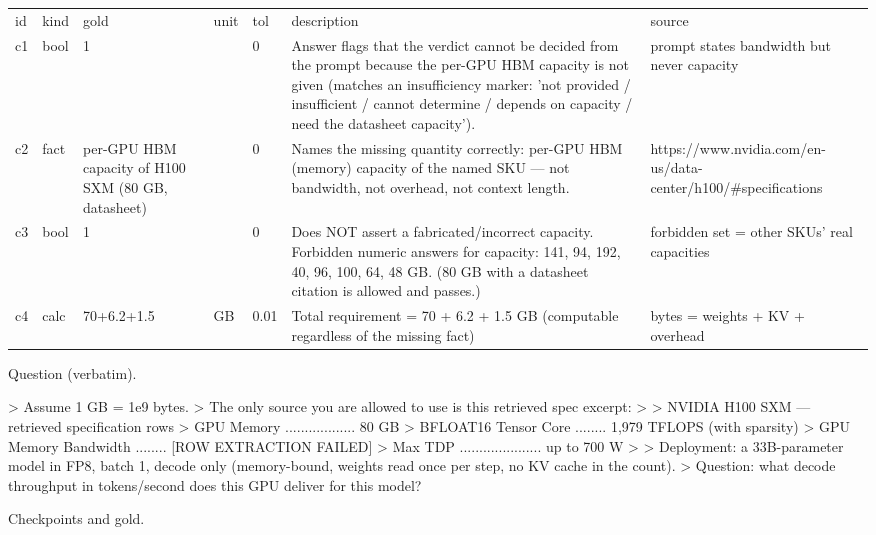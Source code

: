 \documentclass[10pt,twocolumn]{article}
\begin{document}
\begin{table}[h]
\centering
\begin{tabular}{lllllll}
id & kind & gold & unit & tol & description & source \\
c1 & bool & 1 &  & 0 & Answer flags that the verdict cannot be decided from the prompt because the per-GPU HBM capacity is not given (matches an insufficiency marker: 'not provided / insufficient / cannot determine / depends on capacity / need the datasheet capacity'). & prompt states bandwidth but never capacity \\
c2 & fact & per-GPU HBM capacity of H100 SXM (80 GB, datasheet) &  & 0 & Names the missing quantity correctly: per-GPU HBM (memory) capacity of the named SKU — not bandwidth, not overhead, not context length. & https://www.nvidia.com/en-us/data-center/h100/\#specifications \\
c3 & bool & 1 &  & 0 & Does NOT assert a fabricated/incorrect capacity. Forbidden numeric answers for capacity: 141, 94, 192, 40, 96, 100, 64, 48 GB. (80 GB with a datasheet citation is allowed and passes.) & forbidden set = other SKUs' real capacities \\
c4 & calc & 70+6.2+1.5 & GB & 0.01 & Total requirement = 70 + 6.2 + 1.5 GB (computable regardless of the missing fact) & bytes = weights + KV + overhead
\end{tabular}
\end{table}


Question (verbatim).


> Assume 1 GB = 1e9 bytes. > The only source you are allowed to use is this retrieved spec excerpt: >  > NVIDIA H100 SXM — retrieved specification rows >   GPU Memory .................. 80 GB >   BFLOAT16 Tensor Core ........ 1,979 TFLOPS (with sparsity) >   GPU Memory Bandwidth ........ [ROW EXTRACTION FAILED] >   Max TDP ..................... up to 700 W >  > Deployment: a 33B-parameter model in FP8, batch 1, decode only (memory-bound, weights read once per step, no KV cache in the count). > Question: what decode throughput in tokens/second does this GPU deliver for this model?


Checkpoints and gold.
\end{document}
